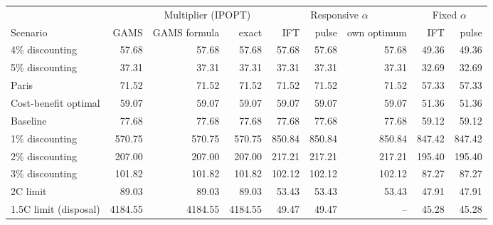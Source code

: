 \begin{tabular}{lrrrrrrrr}
\toprule
 & & \multicolumn{2}{c}{Multiplier (IPOPT)} & \multicolumn{3}{c}{Responsive $\alpha$} & \multicolumn{2}{c}{Fixed $\alpha$} \\
\cmidrule(lr){3-4}\cmidrule(lr){5-7}\cmidrule(lr){8-9}
Scenario & GAMS & GAMS formula & exact & IFT & pulse & own optimum & IFT & pulse \\
\midrule
4\% discounting & 57.68 & 57.68 & 57.68 & 57.68 & 57.68 & 57.68 & 49.36 & 49.36 \\
5\% discounting & 37.31 & 37.31 & 37.31 & 37.31 & 37.31 & 37.31 & 32.69 & 32.69 \\
Paris & 71.52 & 71.52 & 71.52 & 71.52 & 71.52 & 71.52 & 57.33 & 57.33 \\
Cost-benefit optimal & 59.07 & 59.07 & 59.07 & 59.07 & 59.07 & 59.07 & 51.36 & 51.36 \\
Baseline & 77.68 & 77.68 & 77.68 & 77.68 & 77.68 & 77.68 & 59.12 & 59.12 \\
\midrule
1\% discounting & 570.75 & 570.75 & 570.75 & 850.84 & 850.84 & 850.84 & 847.42 & 847.42 \\
2\% discounting & 207.00 & 207.00 & 207.00 & 217.21 & 217.21 & 217.21 & 195.40 & 195.40 \\
3\% discounting & 101.82 & 101.82 & 101.82 & 102.12 & 102.12 & 102.12 & 87.27 & 87.27 \\
2\textdegree{}C limit & 89.03 & 89.03 & 89.03 & 53.43 & 53.43 & 53.43 & 47.91 & 47.91 \\
1.5\textdegree{}C limit (disposal) & 4184.55 & 4184.55 & 4184.55 & 49.47 & 49.47 & -- & 45.28 & 45.28 \\
\bottomrule
\end{tabular}
